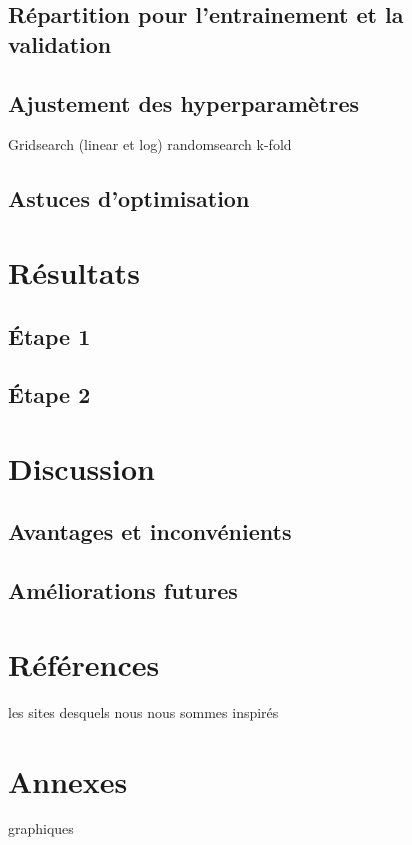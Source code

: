 \documentclass{article}
\begin{document}
\subsection{Répartition pour l'entrainement et la validation}
\subsection{Ajustement des hyperparamètres}
Gridsearch (linear et log)
randomsearch
k-fold

\subsection{Astuces d'optimisation}

\section{Résultats}
\subsection{Étape 1}
\subsection{Étape 2}

\section{Discussion}
\subsection{Avantages et inconvénients}
\subsection{Améliorations futures}

\section{Références}
les sites desquels nous nous sommes inspirés

\section{Annexes}
graphiques
\end{document}
